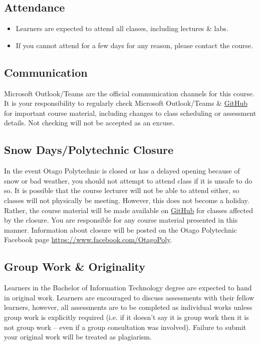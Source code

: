 \documentclass{article}
\begin{document}
\subsection*{Attendance}
\begin{itemize}
	\item Learners are expected to attend all classes, including lectures \& labs.
	\item If you cannot attend for a few days for any reason, please contact the course.
\end{itemize}

\subsection*{Communication}
Microsoft Outlook/Teams are the official communication channels for this course. It is your responsibility to regularly check Microsoft Outlook/Teams \& \href{https://github.com/otago-polytechnic-bit-courses/IN607-intro-app-dev-concepts}{GitHub} for important course material, including changes to class scheduling or assessment details. Not checking will not be accepted as an excuse.

\subsection*{Snow Days/Polytechnic Closure}
In the event Otago Polytechnic is closed or has a delayed opening because of snow or bad weather, you should not attempt to attend class if it is unsafe to do so. It is possible that the course lecturer will not be able to attend either, so classes will not physically be meeting. However, this does not become a holiday. Rather, the course material will be made available on \href{https://github.com/otago-polytechnic-bit-courses/IN607-intro-app-dev-concepts}{GitHub} for classes affected by the closure. You are responsible for any course material presented in this manner. Information about closure will be posted on the Otago Polytechnic Facebook page \href{https://www.facebook.com/OtagoPoly}{https://www.facebook.com/OtagoPoly}.

\subsection*{Group Work \& Originality}
Learners in the Bachelor of Information Technology degree are expected to hand in original work. Learners are encouraged to discuss assessments with their fellow learners, however, all assessments are to be completed as individual works unless group work is explicitly required (i.e. if it doesn’t say it is group work then it is not group work – even if a group consultation was involved). Failure to submit your original work will be treated as plagiarism.
\end{document}
